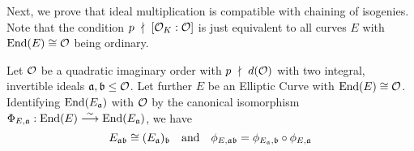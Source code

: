 Next, we prove that ideal multiplication is compatible with chaining of isogenies.
Note that the condition $p \ \nmid \  [\mathcal{O}_K : \mathcal{O}]$ is just equivalent to all curves $E$ with $\mathrm{End}(E) \cong \mathcal{O}$ being ordinary.
\begin{lemma}
    Let $\mathcal{O}$ be a quadratic imaginary order with $p \ \nmid \  d(\mathcal{O})$ with two integral, invertible ideals $\mathfrak{a}, \mathfrak{b} \leq \mathcal{O}$.
    Let further $E$ be an Elliptic Curve with $\mathrm{End}(E) \cong \mathcal{O}$.
    Identifying $\mathrm{End}(E_{\mathfrak{a}})$ with $\mathcal{O}$ by the canonical isomorphism $\Phi_{E, \mathfrak{a}}: \mathrm{End}(E) \overset{\sim}{\longrightarrow} \mathrm{End}(E_{\mathfrak{a}})$, we have
    \begin{equation*}
        E_{\mathfrak{a}\mathfrak{b}} \cong (E_{\mathfrak{a}})_{\mathfrak{b}} \quad \text{and} \quad \phi_{E, \mathfrak{a}\mathfrak{b}} = \phi_{E_{\mathfrak{a}}, \mathfrak{b}} \circ \phi_{E, \mathfrak{a}}
    \end{equation*}
\end{lemma}
